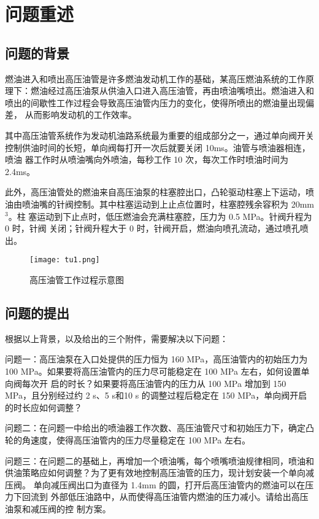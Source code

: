 \documentclass{cumcmthesis}
\begin{document}
\section{问题重述}


\subsection{问题的背景}

燃油进入和喷出高压油管是许多燃油发动机工作的基础，某高压燃油系统的工作原 理下\textsuperscript{\cite{bib:one}}：燃油经过高压油泵从供油入口进入高压油管，再由喷油嘴喷出。燃油进入和 喷出的间歇性工作过程会导致高压油管内压力的变化，使得所喷出的燃油量出现偏差， 从而影响发动机的工作效率。 

其中高压油管系统作为发动机油路系统最为重要的组成部分之一，通过单向阀开关 控制供油时间的长短，单向阀每打开一次后就要关闭 10ms。油管与喷油器相连，喷油 器工作时从喷油嘴向外喷油，每秒工作 10 次，每次工作时喷油时间为 2.4ms。 

此外，高压油管处的燃油来自高压油泵的柱塞腔出口，凸轮驱动柱塞上下运动，喷 油由喷油嘴的针阀控制。其中柱塞运动到上止点位置时，柱塞腔残余容积为 20mm$^3$。柱 塞运动到下止点时，低压燃油会充满柱塞腔，压力为 0.5 MPa。针阀升程为 0 时，针阀 关闭；针阀升程大于 0 时，针阀开启，燃油向喷孔流动，通过喷孔喷出。 

\begin{figure}[htb] \centering 
	
	\texttt{[image: tu1.png]} 
	
	\caption{高压油管工作过程示意图 } \label{fig:1} \end{figure} 
\subsection{问题的提出}
根据以上背景，以及给出的三个附件，需要解决以下问题： 

问题一：高压油泵在入口处提供的压力恒为 160 MPa，高压油管内的初始压力为 100 MPa。如果要将高压油管内的压力尽可能稳定在 100 MPa 左右，如何设置单向阀每次开 启的时长？如果要将高压油管内的压力从 100 MPa 增加到 150 MPa，且分别经过约 2 s、5 s和10 s 的调整过程后稳定在 150 MPa，单向阀开启的时长应如何调整？


问题二：在问题一中给出的喷油器工作次数、高压油管尺寸和初始压力下，确定凸 轮的角速度，使得高压油管内的压力尽量稳定在 100 MPa 左右。

问题三：在问题二的基础上，再增加一个喷油嘴，每个喷嘴喷油规律相同，喷油和 供油策略应如何调整？为了更有效地控制高压油管的压力，现计划安装一个单向减压阀。 单向减压阀出口为直径为 1.4mm 的圆，打开后高压油管内的燃油可以在压力下回流到 外部低压油路中，从而使得高压油管内燃油的压力减小。请给出高压油泵和减压阀的控 制方案。
\end{document}
